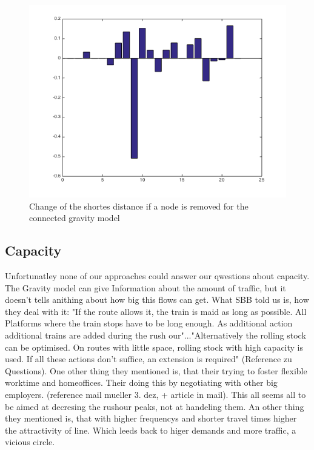 \documentclass[11pt]{article}
\begin{document}
\begin{figure}
\includegraphics[scale=0.5]{connectedNetworkDistanceChange}
 \caption{Change of the shortes distance if a node is removed for the connected gravity model}
\end{figure}
\subsection{Capacity}

Unfortunatley none of our approaches could answer our qwestions about capacity. The Gravity model can give Information about the amount of traffic, but it doesn't tells anithing about how big this flows can get. What SBB told us is, how they deal with it: "If the route allows it, the train is maid as long as possible. All Platforms where the train stops have to be long enough. As additional action additional trains are added during the rush our"..."Alternatively the rolling stock can be optimised. On routes with little space, rolling stock with high capacity is used. If all these actions don't suffice, an extension is required" (Reference zu Questions). One other thing they mentioned is, that their trying to foster flexible worktime and homeoffices. Their doing this by negotiating with other big employers. (reference mail mueller 3. dez, + article in mail). This all seems all to be aimed at decresing the rushour peaks, not at handeling them. An other thing they mentioned is, that with higher frequencys and shorter travel times higher the attractivity of line. Which leeds back to higer demands and more traffic, a vicious circle.
\end{document}
